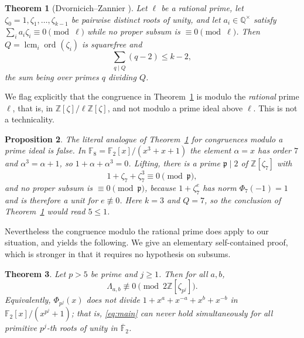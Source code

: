 \documentclass[a4paper]{article}
\newtheorem{theorem}{Theorem}[section]
\newtheorem{proposition}[theorem]{Proposition}
\newcommand{\F}{\mathbb{F}}
\newcommand{\Z}{\mathbb{Z}}
\newcommand{\Q}{\mathbb{Q}}
\newcommand{\ord}[2][]{\operatorname{ord}_{#1}\!\left(#2\right)}
\begin{document}
\begin{theorem}[Dvornicich--Zannier \cite{DvornicichZannier2002}]\label{thm:DZ}
	Let $\ell$ be a rational prime, let $\zeta_0=1,\zeta_1,\ldots,\zeta_{k-1}$
	be pairwise distinct roots of unity, and let $a_i\in\Q^{\times}$
	satisfy $\sum_{i}a_i\zeta_i\equiv0\pmod{\ell}$ while no proper subsum
	is $\equiv0\pmod{\ell}$.
	Then $Q=\operatorname{lcm}_i\ord{\zeta_i}$ is squarefree and
	\[
		\sum_{q\mid Q}(q-2)\leq k-2,
	\]
	the sum being over primes $q$ dividing $Q$.
\end{theorem}

We flag explicitly that the congruence in Theorem~\ref{thm:DZ} is modulo the
\emph{rational} prime $\ell$, that is, in $\Z[\zeta]/\ell\Z[\zeta]$, and not
modulo a prime ideal above $\ell$.
This is not a technicality.

\begin{proposition}\label{prop:DZ-fails-ideals}
	The literal analogue of Theorem~\ref{thm:DZ} for congruences modulo a
	prime ideal is false.
	In $\F_8=\F_2[x]/(x^3+x+1)$ the element $\alpha=x$ has order $7$ and
	$\alpha^{3}=\alpha+1$, so $1+\alpha+\alpha^{3}=0$.
	Lifting, there is a prime $\mathfrak{p}\mid2$ of $\Z[\zeta_7]$ with
	\[
		1+\zeta_7+\zeta_7^{3}\equiv0\pmod{\mathfrak{p}},
	\]
	and no proper subsum is $\equiv0\pmod{\mathfrak{p}}$, because
	$1+\zeta_7^{e}$ has norm $\Phi_7(-1)=1$ and is therefore a unit for
	$e\not\equiv0$.
	Here $k=3$ and $Q=7$, so the conclusion of Theorem~\ref{thm:DZ} would
	read $5\leq1$.
\end{proposition}

Nevertheless the congruence modulo the rational prime does apply to our
situation, and yields the following.
We give an elementary self-contained proof, which is stronger in that it
requires no hypothesis on subsums.

\begin{theorem}\label{thm:all-factors}
	Let $p>5$ be prime and $j\geq1$.
	Then for all $a,b$,
	\[
		\Lambda_{a,b}\not\equiv0\pmod{2\Z[\zeta_{p^j}]} .
	\]
	Equivalently, $\Phi_{p^j}(x)$ does not divide
	$1+x^{a}+x^{-a}+x^{b}+x^{-b}$ in $\F_2[x]/(x^{p^j}+1)$; that is,
	\eqref{eq:main} can never hold simultaneously for all primitive
	$p^j$-th roots of unity in $\overline{\F}_2$.
\end{theorem}
\end{document}

